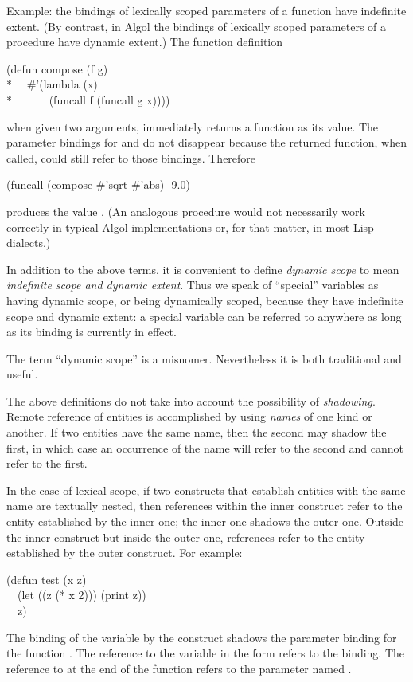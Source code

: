 \begin{itemize}
Example: the bindings of lexically scoped parameters of a function have
indefinite extent.  (By contrast, in Algol the bindings of lexically scoped
parameters of a procedure have dynamic extent.)
The function definition
\begin{lisp}
(defun compose (f g) \\*
~~\#'(lambda (x) \\*
~~~~~~(funcall f (funcall g x))))
\end{lisp}
when given two arguments, immediately returns a function as its value.
The parameter bindings for  and  do not disappear because the
returned function, when called, could still refer to those bindings.
Therefore
\begin{lisp}
(funcall (compose \#'sqrt \#'abs) -9.0)
\end{lisp}
produces the value .  (An analogous procedure would not necessarily work
correctly in typical Algol implementations or, for that matter,
in most Lisp dialects.)
\end{itemize}

In addition to the above terms, it is convenient to define {\it dynamic scope}
to mean {\it indefinite scope and dynamic extent}.  Thus we speak of
``special'' variables as having dynamic scope, or being dynamically scoped,
because they have indefinite scope and dynamic extent: a special variable
can be referred to anywhere as long as its binding is currently
in effect.

\begin{newer}
The term ``dynamic scope'' is a misnomer.  Nevertheless
it is both traditional and useful.
\end{newer}

The above definitions do not take into account the possibility of
{\it shadowing}.  Remote reference of entities is accomplished by using
{\it names} of one kind or another.  If two entities have the same name,
then the second may shadow the first, in which case an occurrence
of the name will refer to the second and cannot refer to the first.

In the case of lexical scope,
if two constructs that establish entities
with the same name are textually nested, then references within the inner
construct refer to the entity established by the inner one; the inner one
shadows the outer one.  Outside the inner construct but inside the outer one,
references refer to the entity established by the outer construct.
For example:
\begin{lisp}
(defun test (x z) \\
~~(let ((z (* x 2))) (print z)) \\
~~z)
\end{lisp}
The binding of the variable  by the  construct shadows
the parameter binding for the function .  The reference to the
variable  in the  form refers to the  binding.
The reference to  at the end of the function refers to the parameter
named .

